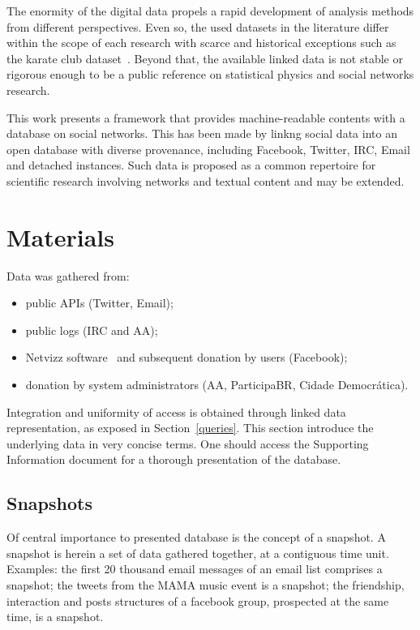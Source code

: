 \documentclass[review]{elsarticle}
\begin{document}
The enormity of the digital data propels a rapid development of analysis methods
from different perspectives.
Even so, the used datasets in the literature differ within the scope of each research with
scarce and historical exceptions such as the
karate club dataset~\cite{newmanBook}.
Beyond that, the available linked data is not 
stable or rigorous enough to be
a public reference on statistical physics and social networks research.
 
This work presents a framework that provides machine-readable contents with a
database on social networks.
This has been made by linkng social data into an open database with diverse
provenance, including Facebook, Twitter, IRC, Email and detached
instances.
Such data is proposed as a common repertoire for scientific
research involving networks and textual content and may be extended.


\section{Materials}\label{materials}
Data was gathered from:
\begin{itemize}
    \item public APIs (Twitter, Email);
    \item public logs (IRC and AA);
    \item Netvizz software~\cite{netvizz} and subsequent donation by users (Facebook);
    \item donation by system administrators (AA, ParticipaBR, Cidade Democr\'atica).
\end{itemize}

Integration and uniformity of access is obtained through linked data
representation, as exposed in Section~\ref{queries}.
This section introduce the underlying data in very concise terms.
One should access the Supporting Information document for
a thorough presentation of the database.

\subsection{Snapshots}
Of central importance to presented database is the concept of a snapshot.
A snapshot is herein a set of data gathered together, at a contiguous time
unit.
Examples: the first 20 thousand email messages of an email list
comprises a snapshot; the tweets from the MAMA music event is a
snapshot; the friendship, interaction and posts structures of a facebook
group, prospected at the same time, is a snapshot.
\end{document}
